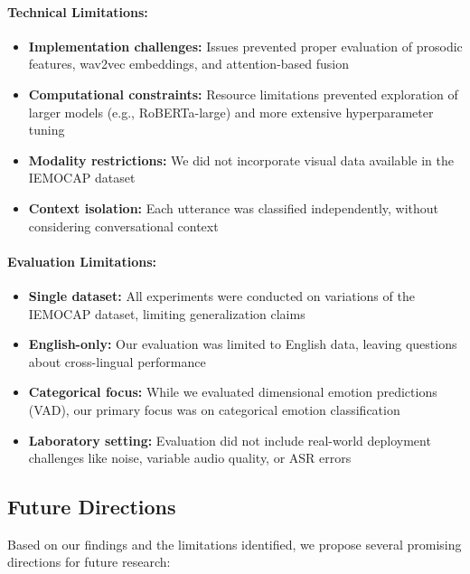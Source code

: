 \documentclass[12pt]{article}
\begin{document}
\paragraph{Technical Limitations:}
\begin{itemize}
    \item \textbf{Implementation challenges:} Issues prevented proper evaluation of prosodic features, wav2vec embeddings, and attention-based fusion
    
    \item \textbf{Computational constraints:} Resource limitations prevented exploration of larger models (e.g., RoBERTa-large) and more extensive hyperparameter tuning
    
    \item \textbf{Modality restrictions:} We did not incorporate visual data available in the IEMOCAP dataset
    
    \item \textbf{Context isolation:} Each utterance was classified independently, without considering conversational context
\end{itemize}

\paragraph{Evaluation Limitations:}
\begin{itemize}
    \item \textbf{Single dataset:} All experiments were conducted on variations of the IEMOCAP dataset, limiting generalization claims
    
    \item \textbf{English-only:} Our evaluation was limited to English data, leaving questions about cross-lingual performance
    
    \item \textbf{Categorical focus:} While we evaluated dimensional emotion predictions (VAD), our primary focus was on categorical emotion classification
    
    \item \textbf{Laboratory setting:} Evaluation did not include real-world deployment challenges like noise, variable audio quality, or ASR errors
\end{itemize}

\subsection{Future Directions}
Based on our findings and the limitations identified, we propose several promising directions for future research:
\end{document}

